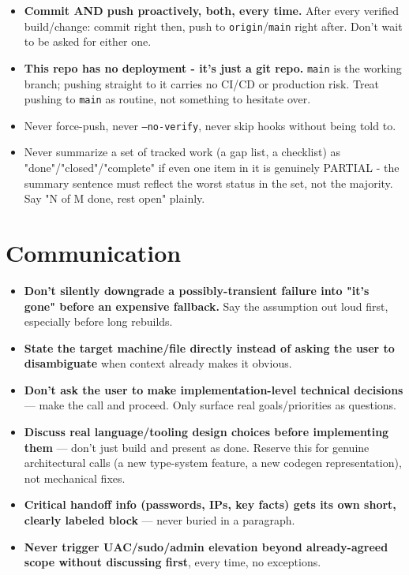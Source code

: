 \documentclass{book}
\begin{document}
\begin{itemize}
\item \textbf{Commit AND push proactively, both, every time.} After every verified build/change: commit right then, push to \texttt{origin}/\texttt{main} right after. Don't wait to be asked for either one.
\item \textbf{This repo has no deployment - it's just a git repo.} \texttt{main} is the working branch; pushing straight to it carries no CI/CD or production risk. Treat pushing to \texttt{main} as routine, not something to hesitate over.
\item Never force-push, never \texttt{--no-verify}, never skip hooks without being told to.
\item Never summarize a set of tracked work (a gap list, a checklist) as "done"/"closed"/"complete" if even one item in it is genuinely PARTIAL - the summary sentence must reflect the worst status in the set, not the majority. Say "N of M done, rest open" plainly.
\end{itemize}

\section{Communication}

\begin{itemize}
\item \textbf{Don't silently downgrade a possibly-transient failure into "it's gone" before an expensive fallback.} Say the assumption out loud first, especially before long rebuilds.
\item \textbf{State the target machine/file directly instead of asking the user to disambiguate} when context already makes it obvious.
\item \textbf{Don't ask the user to make implementation-level technical decisions} — make the call and proceed. Only surface real goals/priorities as questions.
\item \textbf{Discuss real language/tooling design choices before implementing them} — don't just build and present as done. Reserve this for genuine architectural calls (a new type-system feature, a new codegen representation), not mechanical fixes.
\item \textbf{Critical handoff info (passwords, IPs, key facts) gets its own short, clearly labeled block} — never buried in a paragraph.
\item \textbf{Never trigger UAC/sudo/admin elevation beyond already-agreed scope without discussing first}, every time, no exceptions.
\end{itemize}
\end{document}

